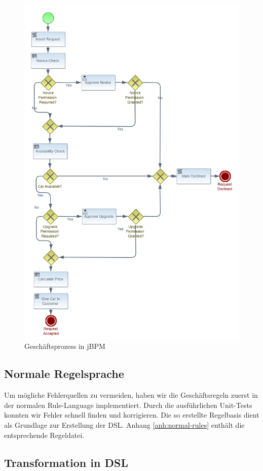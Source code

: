 \begin{figure}[p]
\centering
\includegraphics[width=0.8\linewidth]{Bilder/rental-process}
\caption{Geschäftsprozess in jBPM}
\label{fig:Process_BPMN}
\end{figure}

\subsection{Normale Regelsprache}

Um mögliche Fehlerquellen zu vermeiden, haben wir die Geschäftsregeln zuerst
in der normalen Rule-Language implementiert. Durch die ausführlichen Unit-Tests
konnten wir Fehler schnell finden und korrigieren. Die so erstellte Regelbasis
dient als Grundlage zur Erstellung der DSL. Anhang \ref{anh:normal-rules} enthält
die entsprechende Regeldatei.

\subsection{Transformation in DSL}

